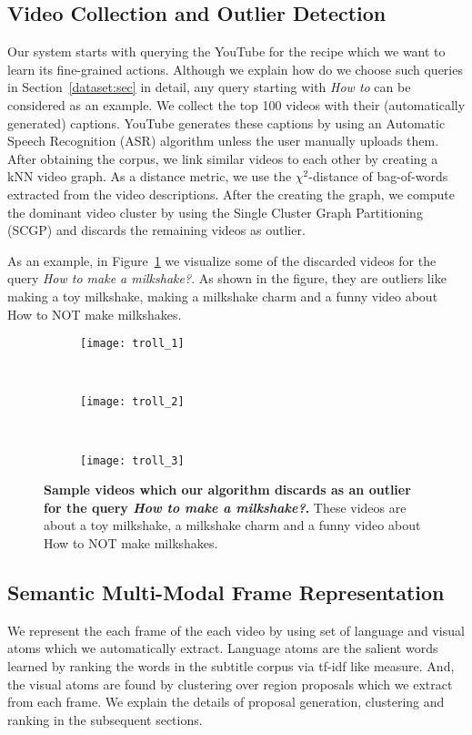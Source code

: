 \subsection{Video Collection and Outlier Detection}
\label{filter}
Our system starts with querying the YouTube for the recipe which we want to learn its fine-grained actions. Although we explain how do we choose such queries in Section~\ref{dataset:sec} in detail, any query starting with \emph{How to} can be considered as an example. We collect the top 100 videos with their (automatically generated) captions. YouTube generates these captions by using an Automatic Speech Recognition (ASR) algorithm unless the user manually uploads them. After obtaining the corpus, we link similar videos to each other by creating a kNN video graph. As a distance metric, we use the $\chi^2$-distance of bag-of-words extracted from the video descriptions. After the creating the graph, we compute the dominant video cluster by using the Single Cluster Graph Partitioning (SCGP)\cite{scgp} and discards the remaining videos as outlier.

As an example, in Figure~\ref{outliers} we visualize some of the discarded videos for the query \emph{How to make a milkshake?}. As shown in the figure, they are outliers like making a toy milkshake, making a milkshake charm and a funny video about How to NOT make milkshakes.
\begin{figure}[ht]
  \begin{subfigure}[b]{0.16\textwidth}
    \texttt{[image: troll\_1]}
  \end{subfigure}~
  \begin{subfigure}[b]{0.16\textwidth}
    \texttt{[image: troll\_2]}
  \end{subfigure}~
  \begin{subfigure}[b]{0.16\textwidth}
    \texttt{[image: troll\_3]}
  \end{subfigure}
\caption{\textbf{Sample videos which our algorithm discards as an outlier for the query \emph{How to make a milkshake?}.} These videos are about a toy milkshake, a milkshake charm and a funny video about How to NOT make milkshakes.}
\label{outliers}
\end{figure}

\subsection{Semantic Multi-Modal Frame Representation}
We represent the each frame of the each video by using set of language and visual atoms which we automatically extract. Language atoms are the salient words learned by ranking the words in the subtitle corpus via tf-idf like measure. And, the visual atoms are found by clustering over region proposals which we extract from each frame. We explain the details of proposal generation, clustering and ranking in the subsequent sections.

